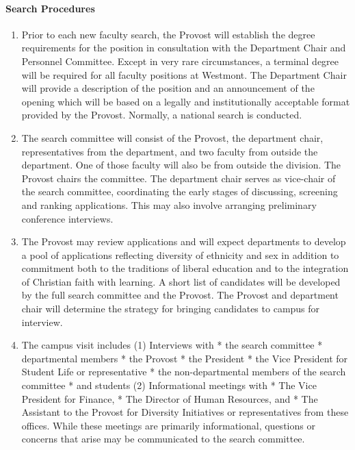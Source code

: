 \documentclass[letterpaper, 11pt]{article}
\begin{document}
			\paragraph{Search Procedures}
				\begin{enumerate}[label=\alph*)]
					\item{ Prior to each new faculty search, the Provost will establish the degree requirements for the position in consultation with the Department Chair and Personnel Committee. Except in very rare circumstances, a terminal degree will be required for all faculty positions at Westmont.  The Department Chair will provide a description of the position and an announcement of the opening which will be based on a legally and institutionally acceptable format provided by the Provost.  Normally, a national search is conducted.}
					\item{The search committee will consist of the Provost, the department chair, representatives from the department, and two faculty from outside the department. One of those faculty will also be from outside the division. The Provost chairs the committee. The department chair serves as vice-chair of the search committee, coordinating the early stages of discussing, screening and ranking applications. This may also involve arranging preliminary conference interviews.}
					\item{The Provost may review applications and will expect departments to develop a pool of applications reflecting diversity of ethnicity and sex in addition to commitment both to the traditions of liberal education and to the integration of Christian faith with learning.  A short list of candidates will be developed by the full search committee and the Provost.  The Provost and department chair will determine the strategy for bringing candidates to campus for interview.}
					\item{ The campus visit includes}
					(1) Interviews with
					* the search committee
					* departmental members
					* the Provost
					* the President
					* the Vice President for Student Life or representative
					* the non-departmental members of the search committee
					* and students
					(2) Informational meetings with
					* The Vice President for Finance,
					* The Director of Human Resources, and
					* The Assistant to the Provost for Diversity Initiatives or representatives from these offices.  While these meetings are primarily informational, questions or concerns that arise may be communicated to the search committee.


\end{enumerate}
\end{document}
